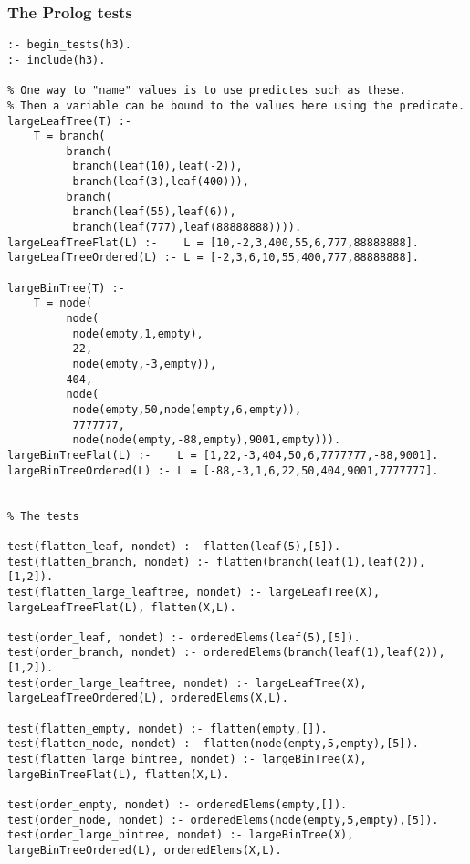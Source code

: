 \documentclass[11pt]{article}
\begin{document}
\subsubsection*{The Prolog tests}
\label{sec:orgb66d8e6}
\begin{verbatim}
:- begin_tests(h3).
:- include(h3).

% One way to "name" values is to use predictes such as these.
% Then a variable can be bound to the values here using the predicate.
largeLeafTree(T) :-
    T = branch(
         branch(
          branch(leaf(10),leaf(-2)),
          branch(leaf(3),leaf(400))),
         branch(
          branch(leaf(55),leaf(6)),
          branch(leaf(777),leaf(88888888)))).
largeLeafTreeFlat(L) :-    L = [10,-2,3,400,55,6,777,88888888].
largeLeafTreeOrdered(L) :- L = [-2,3,6,10,55,400,777,88888888].

largeBinTree(T) :-
    T = node(
         node(
          node(empty,1,empty),
          22,
          node(empty,-3,empty)),
         404,     
         node(
          node(empty,50,node(empty,6,empty)),
          7777777,
          node(node(empty,-88,empty),9001,empty))).
largeBinTreeFlat(L) :-    L = [1,22,-3,404,50,6,7777777,-88,9001].
largeBinTreeOrdered(L) :- L = [-88,-3,1,6,22,50,404,9001,7777777].


% The tests

test(flatten_leaf, nondet) :- flatten(leaf(5),[5]).
test(flatten_branch, nondet) :- flatten(branch(leaf(1),leaf(2)),[1,2]).
test(flatten_large_leaftree, nondet) :- largeLeafTree(X), largeLeafTreeFlat(L), flatten(X,L).

test(order_leaf, nondet) :- orderedElems(leaf(5),[5]).
test(order_branch, nondet) :- orderedElems(branch(leaf(1),leaf(2)),[1,2]).
test(order_large_leaftree, nondet) :- largeLeafTree(X), largeLeafTreeOrdered(L), orderedElems(X,L).

test(flatten_empty, nondet) :- flatten(empty,[]).
test(flatten_node, nondet) :- flatten(node(empty,5,empty),[5]).
test(flatten_large_bintree, nondet) :- largeBinTree(X), largeBinTreeFlat(L), flatten(X,L).

test(order_empty, nondet) :- orderedElems(empty,[]).
test(order_node, nondet) :- orderedElems(node(empty,5,empty),[5]).
test(order_large_bintree, nondet) :- largeBinTree(X), largeBinTreeOrdered(L), orderedElems(X,L).
\end{verbatim}
\end{document}
